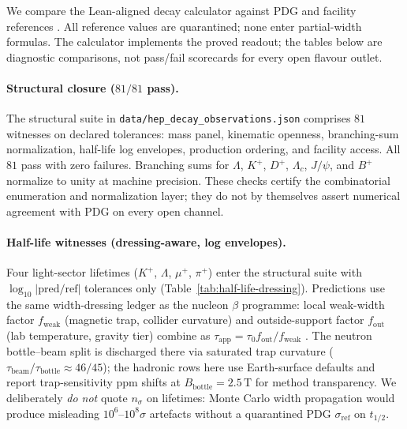 \documentclass[11pt]{amsart}
\begin{document}
We compare the Lean-aligned decay calculator against PDG and facility references
\cite{pdg2024,belle2002,cms2018}.
All reference values are quarantined; none enter partial-width formulas.
The calculator implements the proved readout; the tables below are diagnostic
comparisons, not pass/fail scorecards for every open flavour outlet.

\paragraph{Structural closure ($81/81$ pass).}
The structural suite in \texttt{data/hep\_decay\_observations.json} comprises
$81$ witnesses on declared tolerances: mass panel, kinematic openness, branching-sum
normalization, half-life log envelopes, production ordering, and facility access.
All $81$ pass with zero failures.
Branching sums for $\Lambda$, $K^+$, $D^+$, $\Lambda_c$, $J/\psi$, and $B^+$
normalize to unity at machine precision.
These checks certify the combinatorial enumeration and normalization layer; they do
not by themselves assert numerical agreement with PDG on every open channel.

\paragraph{Half-life witnesses (dressing-aware, log envelopes).}
Four light-sector lifetimes ($K^+$, $\Lambda$, $\mu^+$, $\pi^+$) enter the structural
suite with $\log_{10}|\mathrm{pred}/\mathrm{ref}|$ tolerances only
(Table~\ref{tab:half-life-dressing}).
Predictions use the same width-dressing ledger as the nucleon $\beta$ programme:
local weak-width factor $f_{\mathrm{weak}}$ (magnetic trap, collider curvature) and
outside-support factor $f_{\mathrm{out}}$ (lab temperature, gravity tier) combine as
$\tau_{\mathrm{app}}=\tau_0 f_{\mathrm{out}}/f_{\mathrm{weak}}$
\cite{hqiv-nucleon-binding-paper}.
The neutron bottle--beam split is discharged there via saturated trap curvature
($\tau_{\mathrm{beam}}/\tau_{\mathrm{bottle}}\approx 46/45$); the hadronic rows here
use Earth-surface defaults and report trap-sensitivity ppm shifts at
$B_{\mathrm{bottle}}=2.5\,\mathrm{T}$ for method transparency.
We deliberately \emph{do not} quote $n_\sigma$ on lifetimes: Monte Carlo width
propagation would produce misleading $10^6$--$10^8\sigma$ artefacts without a
quarantined PDG $\sigma_{\mathrm{ref}}$ on $t_{1/2}$.
\end{document}
